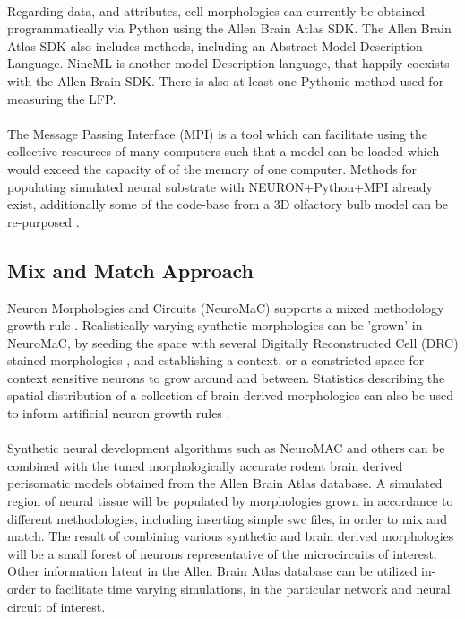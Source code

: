 \documentclass[a4paper,11pt]{article}
\begin{document}
\\
Regarding data, and attributes, cell morphologies can currently be obtained programmatically via Python using the Allen Brain Atlas SDK. The Allen Brain Atlas SDK also includes methods, including an Abstract Model Description Language. NineML is another model Description language, that happily coexists with the Allen Brain SDK. There is also at least one Pythonic method used for measuring the LFP\cite{linden2013lfpy}.\\
\\ 
The Message Passing Interface (MPI) is a tool which can facilitate using the collective resources of many computers such that a model can be loaded which would exceed the capacity of of the memory of one computer. Methods for populating simulated neural substrate with NEURON+Python+MPI already exist, additionally some of the code-base from a 3D olfactory bulb model can be re-purposed \cite{migliore2014distributed}.
\\
\subsection{Mix and Match Approach}
Neuron Morphologies and Circuits (NeuroMaC) supports a mixed methodology growth rule \cite{torben2014context}. Realistically varying synthetic morphologies can be 'grown' in NeuroMaC, by seeding the space with several Digitally Reconstructed Cell (DRC) stained morphologies \cite{torben2014context}, and establishing a context, or a constricted space for context sensitive neurons to grow around and between. Statistics describing the spatial distribution of a collection of brain derived morphologies can also be used to inform artificial neuron growth rules \cite{torben2014context}.\\ %
\\
Synthetic neural development algorithms such as NeuroMAC and others can be combined with the tuned morphologically accurate rodent brain derived perisomatic models obtained from the Allen Brain Atlas database. A simulated region of neural tissue will be populated by morphologies grown in accordance to different methodologies, including inserting simple swc files, in order to mix and match. The result of combining various synthetic and brain derived morphologies will be a small forest of neurons representative of the microcircuits of interest. Other information latent in the Allen Brain Atlas database can be utilized in-order to facilitate time varying simulations, in the particular network and neural circuit of interest.\\
\\
 
\end{document}
